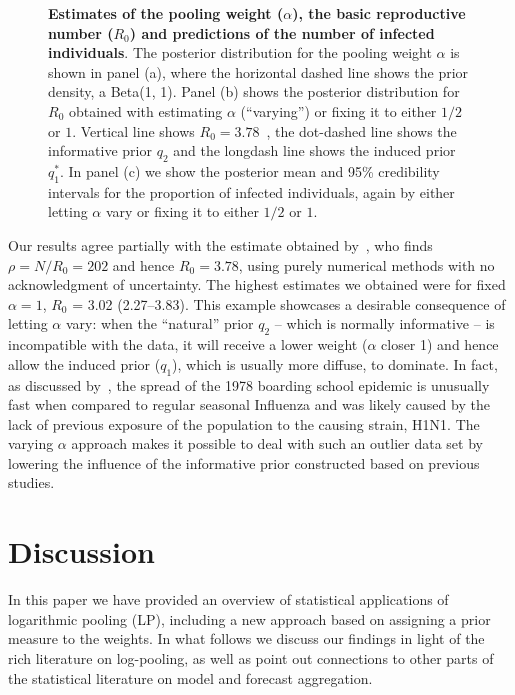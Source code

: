 \documentclass[a4paper, notitlepage, 11pt]{article}
\begin{document}
\begin{figure}[!ht]
\begin{center}
\end{center}
\caption{\textbf{Estimates of the pooling weight ($\alpha$), the basic reproductive number ($R_0$) and predictions of the number of infected individuals}.
The posterior distribution for the pooling weight $\alpha$ is shown in panel (a), where the horizontal dashed line shows the prior density, a Beta(1, 1).
Panel (b) shows the posterior distribution for $R_0$ obtained with estimating $\alpha$ (``varying'') or fixing it to either $1/2$ or $1$.
Vertical line shows $R_0 = 3.78$~\citep{Murray2002}, the dot-dashed line shows the informative prior $q_2$ and the longdash line shows the induced prior $q_1^\ast$.
In panel (c) we show the posterior mean and 95\% credibility intervals for the proportion of infected individuals, again by either letting $\alpha$ vary or fixing it to either $1/2$ or $1$.
}
\label{fig:SIR_results}
\end{figure}

Our results agree partially with the estimate obtained by~\cite{Murray2002}, who finds $\rho = N/R_0 = 202$ and hence $R_0 = 3.78$, using purely numerical methods with no acknowledgment of uncertainty.
The highest estimates we obtained were for fixed $\alpha = 1$, $R_0$ = 3.02 (2.27--3.83).
This example showcases a desirable consequence of letting $\alpha$ vary: when the ``natural'' prior $q_2$ -- which is normally informative -- is incompatible with the data, it will receive a lower weight ($\alpha$ closer 1) and hence allow the induced prior ($q_1$), which is usually more diffuse, to dominate.
In fact, as discussed by~\cite{Biggerstaff2014}, the spread of the 1978 boarding school epidemic is unusually fast when compared to regular seasonal Influenza and was likely caused by the lack of previous exposure of the population to the causing strain, H1N1.
The varying $\alpha$ approach makes it possible to deal with such an outlier data set by lowering the influence of the informative prior constructed based on previous studies.

\section{Discussion}
\label{sec:discussion}

In this paper we have provided an overview of statistical applications of logarithmic pooling (LP), including a new approach based on assigning a prior measure to the weights.
In what follows we discuss our findings in light of the rich literature on log-pooling, as well as point out connections to other parts of the statistical literature on model and forecast aggregation.
\end{document}
